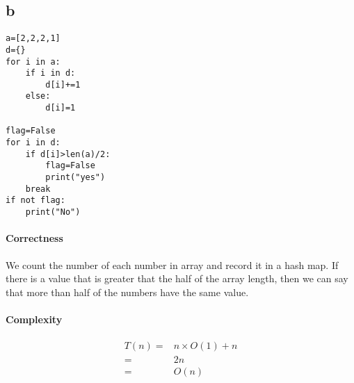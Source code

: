 \documentclass{article}
\begin{document}
    \subsection*{b}
    \begin{lstlisting}
a=[2,2,2,1]
d={}
for i in a:
    if i in d:
        d[i]+=1
    else:
        d[i]=1

flag=False
for i in d:
    if d[i]>len(a)/2:
        flag=False
        print("yes")
    break
if not flag:
    print("No")  
    \end{lstlisting}
    \paragraph{Correctness}
    We count the number of each number in array and record it in a hash map. If there is a value  that is greater that the half of the array length, then we can say that more than half of the numbers have the same value.
    \paragraph{Complexity} 
    \begin{equation}
        \begin{split}
            T(n)=&n\times O(1)+n\\
                =&2n\\
                =&O(n)
        \end{split}
    \end{equation}
\end{document}
